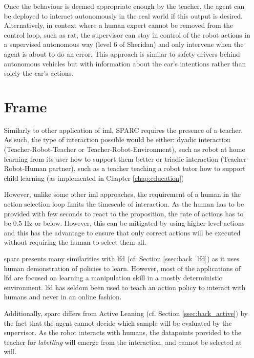 Once the behaviour is deemed appropriate enough by the teacher, the agent can be deployed to interact autonomously in the real world if this output is desired. Alternatively, in context where a human expert cannot be removed from the control loop, such as \acrlong{rat}, the supervisor can stay in control of the robot actions in a supervised autonomous way (level 6 of Sheridan) and only intervene when the agent is about to do an error. This approach is similar to safety drivers behind autonomous vehicles but with information about the car's intentions rather than solely the car's actions. 

\section{Frame}

Similarly to other application of \gls{iml}, SPARC requires the presence of a teacher. As such, the type of interaction possible would be either: dyadic interaction (Teacher-Robot-Teacher or Teacher-Robot-Environment), such as  robot at home learning from its user how to support them better or triadic interaction (Teacher-Robot-Human partner), such as a teacher teaching a robot tutor how to support child learning (as implemented in Chapter \ref{chap:education})

However, unlike some other \gls{iml} approaches, the requirement of a human in the action selection loop limits the timescale of interaction. As the human has to be provided with few seconds to react to the proposition, the rate of actions has to be 0.5 Hz or below. However, this can be mitigated by using higher level actions and this has the advantage to ensure that only correct actions will be executed without requiring the human to select them all.

\gls{sparc} presents many similarities with \acrlong{lfd} (cf. Section \ref{ssec:back_lfd}) as it uses human demonstration of policies to learn. However, most of the applications of \gls{lfd} \citep{argall2009survey,billard2008robot} are focused on learning a manipulation skill in a mostly deterministic environment. \gls{lfd} has seldom been used to teach an action policy to interact with humans \citep{liu2014train,sequeira2016discovering} and never in an online fashion.

Additionally, \gls{sparc} differs from Active Leaning (cf. Section \ref{ssec:back_active}) by the fact that the agent cannot decide which sample will be evaluated by the supervisor. As the robot interacts with humans, the datapoints provided to the teacher for \textit{labelling} will emerge from the interaction, and cannot be selected at will. 

